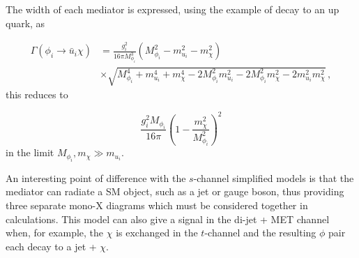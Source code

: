 \vspace{5mm}

The width of each mediator is expressed, using the example of decay to an up quark, as

\begin{equation}
\begin{split}
\Gamma (\phi_i \rightarrow \bar{u}_i \chi) &= \frac{g_i^2}{16 \pi M_{\phi_i}^3}(M_{\phi_i}^2 - m_{u_i}^2 - m_{\chi}^2) 		\\
					   & \times \sqrt{M_{\phi_i}^4 + m_{u_i}^4 + m_{\chi}^4 - 2M_{\phi_i}^2m_{u_i}^2 - 2M_{\phi_i}^2m_{\chi}^2 - 2m_{u_i}^2m_{\chi}^2} \, ,
\end{split}
\end{equation}
this reduces to 

\begin{equation}
\frac{g_i^2 M_{\phi_i}}{16 \pi} \left(1 - \frac{m_{\chi}^2}{M_{\phi_i}^2} \right)^2
\end{equation}
in the limit $M_{\phi_i}, m_{\chi} \gg m_{u_i}$.

\vspace{5mm}

An interesting point of difference with the $s$-channel simplified models is that the mediator can radiate a SM object, such as a jet or gauge boson, thus providing three separate mono-X diagrams which must be considered together in calculations. This model can also give a signal in the di-jet + MET channel when, for example, the $\chi$ is exchanged in the $t$-channel and the resulting $\phi$ pair each decay to a jet + $\chi$. 
